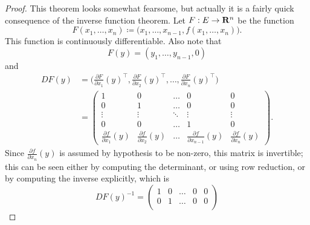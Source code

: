 \begin{proof}
  This theorem looks somewhat fearsome, but actually it is a fairly quick consequence of the inverse function theorem.
  Let \(F : E \to \mathbf{R}^n\) be the function
  \[
    F(x_1, \dots, x_n) \coloneqq \big(x_1, \dots, x_{n - 1}, f(x_1, \dots, x_n)\big).
  \]
  This function is continuously differentiable.
  Also note that
  \[
    F(y) = (y_1, \dots, y_{n - 1}, 0)
  \]
  and
  \begin{align*}
    D F(y) & = \bigg(\frac{\partial F}{\partial x_1}(y)^\top, \frac{\partial F}{\partial x_2}(y)^\top, \dots, \frac{\partial F}{\partial x_n}(y)^\top\bigg)                                         \\
           & = \begin{pmatrix}
                 1                                  & 0                                  & \dots  & 0                                        & 0                                  \\
                 0                                  & 1                                  & \dots  & 0                                        & 0                                  \\
                 \vdots                             & \vdots                             & \ddots & \vdots                                   & \vdots                             \\
                 0                                  & 0                                  & \dots  & 1                                        & 0                                  \\
                 \frac{\partial f}{\partial x_1}(y) & \frac{\partial f}{\partial x_2}(y) & \dots  & \frac{\partial f}{\partial x_{n - 1}}(y) & \frac{\partial f}{\partial x_n}(y)
               \end{pmatrix}.
  \end{align*}
  Since \(\frac{\partial f}{\partial x_n}(y)\) is assumed by hypothesis to be non-zero, this matrix is invertible;
  this can be seen either by computing the determinant, or using row reduction, or by computing the inverse explicitly, which is
  \[
    D F(y)^{-1} = \begin{pmatrix}
      1                                       & 0                                       & \dots  & 0                                             & 0      \\
      0                                       & 1                                       & \dots  & 0                                             & 0      \\

\end{pmatrix}\]
\end{proof}
